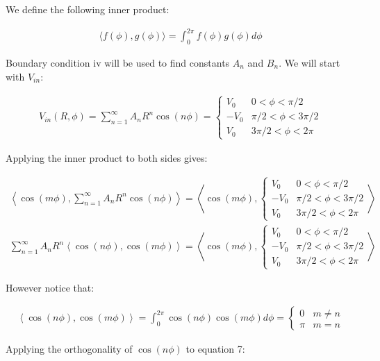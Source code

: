 \documentclass[12pt, a4paper]{article}
\begin{document}
We define the following inner product:

\begin{gather}
\langle f(\phi), g(\phi) \rangle = \int_0^{2\pi} f(\phi) g(\phi) d\phi
\end{gather}

Boundary condition iv will be used to find constants $A_n$ and $B_n$. We will start with $V_{in}$:

\begin{gather}
V_{in} (R, \phi) = \sum_{n=1}^\infty A_n R^n \cos (n\phi) = \begin{cases} V_0 & 0 < \phi < \pi/2 \\ -V_0 & \pi/2 < \phi < 3\pi/2 \\ V_0 & 3\pi/2 < \phi < 2\pi \end{cases}
\end{gather}

Applying the inner product to both sides gives:

\begin{gather}
\left\langle \cos(m\phi), \sum_{n=1}^\infty A_n R^n \cos (n\phi) \right\rangle = \left\langle \cos(m\phi), \begin{cases} V_0 & 0 < \phi < \pi/2 \\ -V_0 & \pi/2 < \phi < 3\pi/2 \\ V_0 & 3\pi/2 < \phi < 2\pi \end{cases} \right\rangle \\
\sum_{n=1}^\infty A_n R^n \left\langle \cos(n\phi), \cos (m\phi) \right\rangle = \left\langle \cos(m\phi), \begin{cases} V_0 & 0 < \phi < \pi/2 \\ -V_0 & \pi/2 < \phi < 3\pi/2 \\ V_0 & 3\pi/2 < \phi < 2\pi \end{cases} \right\rangle
\end{gather}

However notice that:

\begin{gather}
\left\langle \cos(n\phi), \cos (m\phi) \right\rangle = \int_0^{2\pi}\cos(n\phi) \cos (m\phi) d\phi = \begin{cases} 0 & m \ne n \\ \pi & m=n \end{cases}
\end{gather}

Applying the orthogonality of $\cos(n\phi)$ to equation 7:
\end{document}
